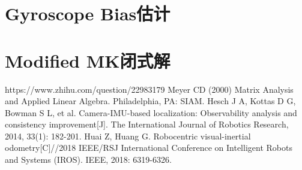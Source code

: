 \documentclass{article}
\begin{document}
\section{Gyroscope Bias估计}

\section{Modified MK闭式解}


\begin{thebibliography}{99}  
    https://www.zhihu.com/question/22983179
    Meyer CD (2000) Matrix Analysis and Applied Linear Algebra. Philadelphia, PA: SIAM.
     Hesch J A, Kottas D G, Bowman S L, et al. Camera-IMU-based localization: Observability analysis and consistency improvement[J]. The International Journal of Robotics Research, 2014, 33(1): 182-201.
     Huai Z, Huang G. Robocentric visual-inertial odometry[C]//2018 IEEE/RSJ International Conference on Intelligent Robots and Systems (IROS). IEEE, 2018: 6319-6326.
\end{thebibliography}
\end{document}
